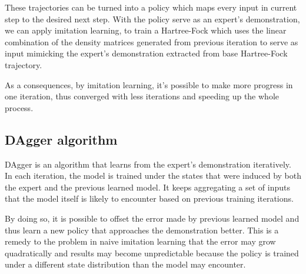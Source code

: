 \documentclass[twoside]{article}
\begin{document}
These trajectories can be turned into a policy which maps every input in current step to the desired next step. With the policy  serve as an expert's demonstration, we can apply imitation learning, to train a Hartree-Fock which uses the linear combination of the density matrices generated from previous iteration to serve as input mimicking the expert's demonstration extracted from base Hartree-Fock trajectory.

As a consequences, by imitation learning, it's possible to make more progress in one iteration, thus converged with less iterations and speeding up the whole process.  







\subsection{DAgger algorithm}
DAgger is an algorithm that learns from the expert's demonstration iteratively. In each iteration, the model is trained under the states that were induced by both the expert and the previous learned model. It keeps aggregating a set of inputs that the model itself is likely to encounter based on previous training iterations.  

By doing so, it is possible to offset the error made by previous learned model and thus learn a new policy that approaches the demonstration better. This is a remedy to the problem in naive imitation learning that the error may grow quadratically and results may become unpredictable because the policy is trained under a different state distribution than the model may encounter. 
\end{document}

